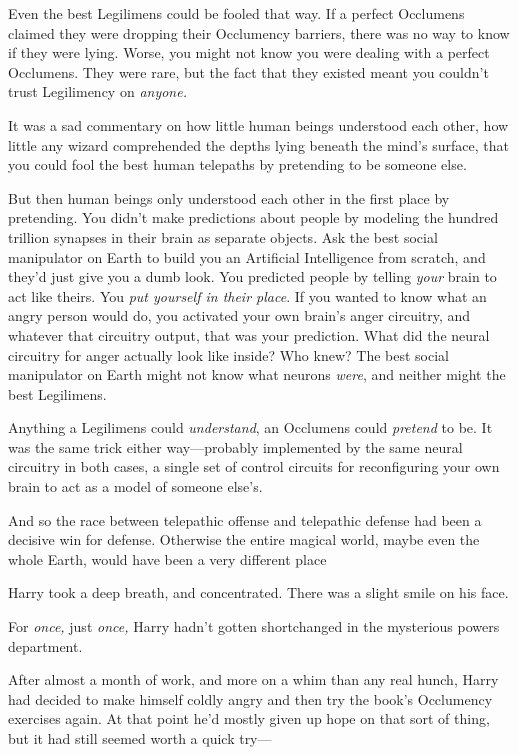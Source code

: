 Even the best Legilimens could be fooled that way. If a perfect Occlumens
claimed they were dropping their Occlumency barriers, there was no way to know
if they were lying. Worse, you might not know you were dealing with a perfect
Occlumens. They were rare, but the fact that they existed meant you couldn't
trust Legilimency on \emph{anyone.}

It was a sad commentary on how little human beings understood each other, how
little any wizard comprehended the depths lying beneath the mind's surface,
that you could fool the best human telepaths by pretending to be someone else.

But then human beings only understood each other in the first place by
pretending. You didn't make predictions about people by modeling the hundred
trillion synapses in their brain as separate objects. Ask the best social
manipulator on Earth to build you an Artificial Intelligence from scratch, and
they'd just give you a dumb look. You predicted people by telling \emph{your}
brain to act like theirs. You \emph{put yourself in their place}. If you wanted
to know what an angry person would do, you activated your own brain's anger
circuitry, and whatever that circuitry output, that was your prediction. What
did the neural circuitry for anger actually look like inside? Who knew? The
best social manipulator on Earth might not know what neurons \emph{were}, and
neither might the best Legilimens.

Anything a Legilimens could \emph{understand}, an Occlumens could
\emph{pretend} to be. It was the same trick either way---probably implemented
by the same neural circuitry in both cases, a single set of control circuits
for reconfiguring your own brain to act as a model of someone else's.

And so the race between telepathic offense and telepathic defense had been a
decisive win for defense. Otherwise the entire magical world, maybe even the
whole Earth, would have been a very different place{\el}

Harry took a deep breath, and concentrated. There was a slight smile on his
face.

For \emph{once,} just \emph{once,} Harry hadn't gotten shortchanged in the
mysterious powers department.

After almost a month of work, and more on a whim than any real hunch, Harry had
decided to make himself coldly angry and then try the book's Occlumency
exercises again. At that point he'd mostly given up hope on that sort of thing,
but it had still seemed worth a quick try\mbox{---}

